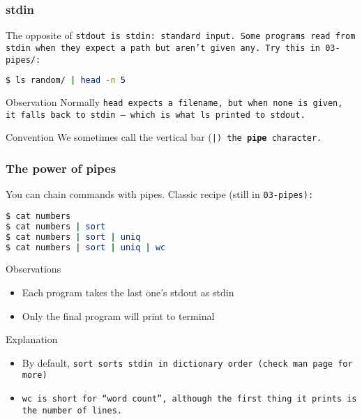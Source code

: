 \begin{frame}[fragile]
\frametitle{stdin}
The opposite of \tt{stdout} is \tt{stdin}: standard input.
Some programs read from stdin when they expect a path but aren't given any.
\newline \newline
Try this in \tt{03-pipes/}:
\begin{lstlisting}[language=bash]
$ ls random/ | head -n 5
\end{lstlisting}
\pause
\begin{block}{Observation}
    Normally \tt{head} expects a filename, but when none is given, it
    falls back to stdin — which is what \tt{ls} printed to stdout.
\end{block}
\begin{block}{Convention}
    We sometimes call the vertical bar (\tt{|}) the \textbf{pipe} character.
\end{block}
\end{frame}

\begin{frame}[fragile]
\frametitle{The power of pipes}
You can chain commands with pipes. Classic recipe (still in \tt{03-pipes}):
\begin{lstlisting}[language=bash]
$ cat numbers
$ cat numbers | sort
$ cat numbers | sort | uniq
$ cat numbers | sort | uniq | wc
\end{lstlisting}
\pause
\begin{block}{Observations}
    \begin{itemize}
        \item Each program takes the last one's stdout as stdin
        \item Only the final program will print to terminal
    \end{itemize}
\end{block}
\begin{block}{Explanation}
    \begin{itemize}
        \item By default, \tt{sort} sorts stdin in dictionary order
            (check man page for more)
        \item \tt{wc} is short for ``word count'', although the first thing
            it prints is the number of lines.
    \end{itemize}
\end{block}
\end{frame}

